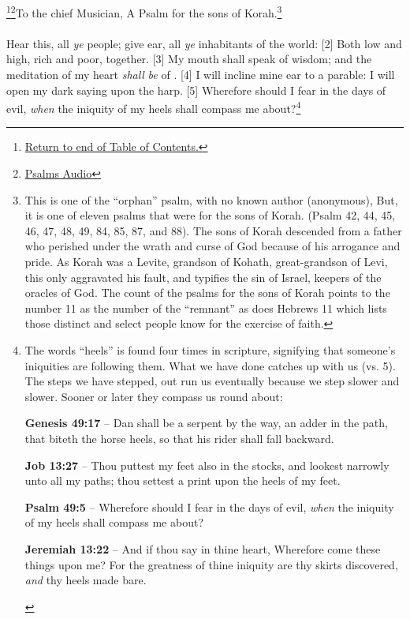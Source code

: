 \footnote{\textcolor[cmyk]{0.99998,1,0,0}{\hyperlink{TOC}{Return to end of Table of Contents.}}}\footnote{\href{https://audiobible.com/bible/psalms_49.html}{\textcolor[cmyk]{0.99998,1,0,0}{Psalms Audio}}}\textcolor[cmyk]{0.99998,1,0,0}{To the chief Musician, A Psalm for the sons of Korah.}\footnote{This is one of the ``orphan'' psalm, with no known author (anonymous), But, it is one of eleven psalms that were for the sons of Korah. (Psalm 42, 44, 45, 46, 47, 48, 49, 84, 85, 87, and 88). The sons of Korah descended from a father who perished under the wrath and curse of God because of his arrogance and pride.   As Korah was a Levite, grandson of Kohath, great-grandson of Levi, this only aggravated his fault, and typifies the sin of Israel, keepers of the oracles of God. \cite{Phillips2001ExploringPsalms1} The count of the psalms for the sons of Korah points to the number 11 as the number of the ``remnant'' as does Hebrews 11 which lists those distinct and select people know for the exercise of faith.}\\
\\
\textcolor[cmyk]{0.99998,1,0,0}{Hear this, all \emph{ye} people; give ear, all \emph{ye} inhabitants of the world:}
[2] \textcolor[cmyk]{0.99998,1,0,0}{Both low and high, rich and poor, together.}
[3] \textcolor[cmyk]{0.99998,1,0,0}{My mouth shall speak of wisdom; and the meditation of my heart \emph{shall} \emph{be} of .}
[4] \textcolor[cmyk]{0.99998,1,0,0}{I will incline mine ear to a parable: I will open my dark saying upon the harp.}
[5] \textcolor[cmyk]{0.99998,1,0,0}{Wherefore should I fear in the days of evil, \emph{when} the iniquity of my heels shall compass me about?}\footnote{The words ``heels'' is found four times in scripture, signifying that someone’s iniquities are following them. What we have done catches up with us (vs. 5). The steps we have stepped, out run us eventually because we step slower and slower. Sooner or later they compass us round about: \cite{Ruckman1992Psalms}
\begin{compactenum}
\item \textbf{Genesis 49:17} -- Dan shall be a serpent by the way, an adder in the path, that biteth the horse heels, so that his rider shall fall backward.
\item \textbf{Job 13:27} -- Thou puttest my feet also in the stocks, and lookest narrowly unto all my paths; thou settest a print upon the heels of my feet.
\item \textbf{Psalm 49:5} -- Wherefore should I fear in the days of evil, \emph{when} the iniquity of my heels shall compass me about?
\item \textbf{Jeremiah 13:22} -- And if thou say in thine heart, Wherefore come these things upon me? For the greatness of thine iniquity are thy skirts discovered, \emph{and} thy heels made bare.
\end{compactenum} }
